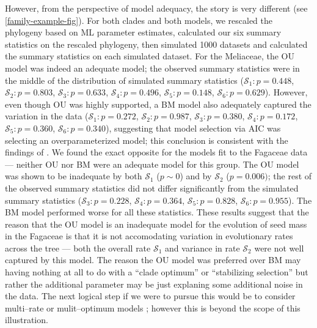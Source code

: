 \documentclass[a4paper,12pt]{article}
\begin{document}
However, from the perspective of model adequacy, the story is very different (see \ref{family-example-fig}). For both clades and both models, we rescaled the phylogeny based on ML parameter estimates, calculated our six summary statistics on the rescaled phylogeny, then simulated 1000 datasets and calculated the summary statistics on each simulated dataset. For the Meliaceae, the OU model was indeed an adequate model; the observed summary statistics were in the middle of the distribution of simulated summary statistics ($\mathcal{S}_1: p=0.448$, $\mathcal{S}_2: p=0.803$, $\mathcal{S}_3: p=0.633$, $\mathcal{S}_4:p=0.496$, $\mathcal{S}_5: p=0.148$, $\mathcal{S}_6: p=0.629$). However, even though OU was highly supported, a BM model also adequately captured the variation in the data ($\mathcal{S}_1: p=0.272$, $\mathcal{S}_2: p=0.987$, $\mathcal{S}_3: p=0.380$, $\mathcal{S}_4:p=0.172$, $\mathcal{S}_5: p=0.360$, $\mathcal{S}_6: p=0.340$), suggesting that model selection via AIC was selecting an overparameterized model; this conclusion is consistent with the findings of \citet{Boettiger2012}. We found the exact opposite for the models fit to the Fagaceae data --- neither OU nor BM were an adequate model for this group. The OU model was shown to be inadequate by both $\mathcal{S}_1$ ($p \sim 0$) and by $\mathcal{S}_2$ ($p=0.006)$; the rest of the observed summary statistics did not differ significantly from the simulated summary statistics ($\mathcal{S}_3: p=0.228$, $\mathcal{S}_4:p=0.364$, $\mathcal{S}_5: p=0.828$, $\mathcal{S}_6: p=0.955$). The BM model performed worse for all these statistics. These results suggest that the reason that the OU model is an inadequate model for the evolution of seed mass in the Fagaceae is that it is not accomodating variation in evolutionary rates across the tree --- both the overall rate $\mathcal{S}_1$ and variance in rate $\mathcal{S}_2$ were not well captured by this model. The reason the OU model was preferred over BM may having nothing at all to do with a ``clade optimum'' or ``stabilizing selection'' but rather the additional parameter may be just explaning some additional noise in the data. The next logical step if we were to pursue this would be to consider multi--rate or mulit--optimum models \citep[e.g.][]{Omeara2006, Eastman2011, Beaulieu2012, UyedaBayou}; however this is beyond the scope of this illustration.
\end{document}
